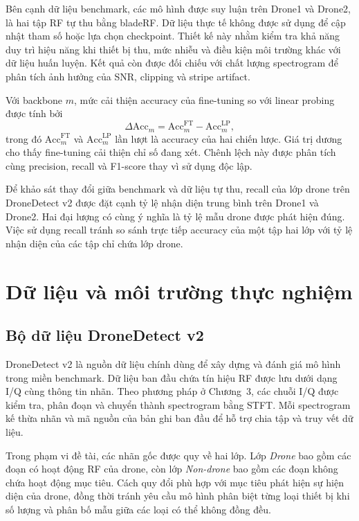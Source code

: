 \documentclass[../DoAn.tex]{subfiles}
\begin{document}
Bên cạnh dữ liệu benchmark, các mô hình được suy luận trên Drone1 và Drone2, là hai tập RF tự thu bằng bladeRF. Dữ liệu thực tế không được sử dụng để cập nhật tham số hoặc lựa chọn checkpoint. Thiết kế này nhằm kiểm tra khả năng duy trì hiệu năng khi thiết bị thu, mức nhiễu và điều kiện môi trường khác với dữ liệu huấn luyện. Kết quả còn được đối chiếu với chất lượng spectrogram để phân tích ảnh hưởng của SNR, clipping và stripe artifact.

Với backbone $m$, mức cải thiện accuracy của fine-tuning so với linear probing được tính bởi
\begin{equation}
    \Delta \mathrm{Acc}_{m}
    =
    \mathrm{Acc}^{\mathrm{FT}}_{m}
    -
    \mathrm{Acc}^{\mathrm{LP}}_{m},
    \label{eq:accuracy_gain}
\end{equation}
trong đó $\mathrm{Acc}^{\mathrm{FT}}_{m}$ và $\mathrm{Acc}^{\mathrm{LP}}_{m}$ lần lượt là accuracy của hai chiến lược. Giá trị dương cho thấy fine-tuning cải thiện chỉ số đang xét. Chênh lệch này được phân tích cùng precision, recall và F1-score thay vì sử dụng độc lập.

Để khảo sát thay đổi giữa benchmark và dữ liệu tự thu, recall của lớp drone trên DroneDetect v2 được đặt cạnh tỷ lệ nhận diện trung bình trên Drone1 và Drone2. Hai đại lượng có cùng ý nghĩa là tỷ lệ mẫu drone được phát hiện đúng. Việc sử dụng recall tránh so sánh trực tiếp accuracy của một tập hai lớp với tỷ lệ nhận diện của các tập chỉ chứa lớp drone.

\section{Dữ liệu và môi trường thực nghiệm}

\subsection{Bộ dữ liệu DroneDetect v2}

DroneDetect v2 là nguồn dữ liệu chính dùng để xây dựng và đánh giá mô hình trong miền benchmark. Dữ liệu ban đầu chứa tín hiệu RF được lưu dưới dạng I/Q cùng thông tin nhãn. Theo phương pháp ở Chương~3, các chuỗi I/Q được kiểm tra, phân đoạn và chuyển thành spectrogram bằng STFT. Mỗi spectrogram kế thừa nhãn và mã nguồn của bản ghi ban đầu để hỗ trợ chia tập và truy vết dữ liệu.

Trong phạm vi đề tài, các nhãn gốc được quy về hai lớp. Lớp \textit{Drone} bao gồm các đoạn có hoạt động RF của drone, còn lớp \textit{Non-drone} bao gồm các đoạn không chứa hoạt động mục tiêu. Cách quy đổi phù hợp với mục tiêu phát hiện sự hiện diện của drone, đồng thời tránh yêu cầu mô hình phân biệt từng loại thiết bị khi số lượng và phân bố mẫu giữa các loại có thể không đồng đều.
\end{document}
